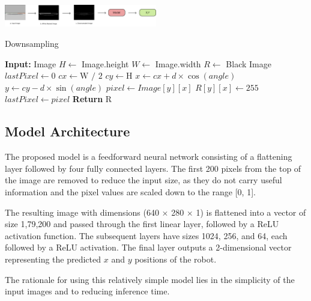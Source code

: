 \documentclass[a4paper]{article}
\begin{document}
\begin{multicols}{2}
\par \noindent

{ \centering
  \includegraphics[width=0.5\textwidth]{../results/Flowchart.png}\\
  \label{fig:flowchart}
}
\begin{algorithm}[H]
  \caption{Downsampling}
\begin{algorithmic}[1]
\Statex \textbf{Input: }Image
\State $H \gets$ Image.height
\State $W \gets$ Image.width
\State $R \gets$ Black Image
    \State $lastPixel \gets 0$
    \State $cx \gets \text{W / 2}$
    \State $cy \gets \text{H}$
        \State $x \gets cx + d \times \cos(angle)$
        \State $y \gets cy - d \times \sin(angle)$
          \State $pixel \gets Image[y][x]$
            \State $R[y][x] \gets 255 $ 
          \EndIf
          \State $lastPixel \gets pixel$
        \EndIf
    \EndFor
\EndFor
\State \textbf{Return} R
\end{algorithmic}
\end{algorithm}

\subsection{Model Architecture}
\par \noindent
The proposed model is a feedforward neural network consisting of a flattening layer followed 
by four fully connected layers. The first 200 pixels from the top of the image are removed 
to reduce the input size, as they do not carry useful information and the pixel values are scaled
down to the range [0, 1].

\par \noindent
The resulting image with dimensions (640 $\times$ 280 $\times$ 1) is flattened into a vector 
of size 1,79,200 and passed through the first linear layer, followed by a ReLU activation function.
The subsequent layers have sizes 1024, 256, and 64, each followed by a ReLU activation. 
The final layer outputs a 2-dimensional vector representing the predicted $x$ and $y$ positions of the robot.

\par \noindent
The rationale for using this relatively simple model lies in the simplicity of the input images 
and to reducing inference time.


\end{multicols}
\end{document}
